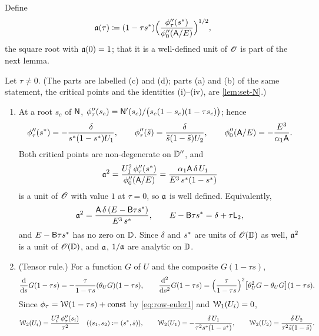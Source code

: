 Define
\begin{equation}
\label{eq:row-algdef}
\mathfrak{a}(\tau)\coloneqq(1-\tau s^{\ast})\Big(\frac{\phi_\tau''(s^{\ast})}{\phi_0''(\mathsf{A}/E)}\Big)^{1/2},
\end{equation}
the square root with $\mathfrak{a}(0)=1$; that it is a well-defined unit of $\mathscr{O}$ is part of the next lemma.

\begin{lem}
\label{lem:row-hess}
Let $\tau\neq0$. (The parts are labelled (c) and (d); parts (a) and (b) of the same statement, the critical points and the identities (i)--(iv), are \cref{lem:set-N}.)
\begin{enumerate}
\item[(c)] At a root $s_c$ of $\mathsf{N}$, $\phi_\tau''(s_c)=\mathsf{N}'(s_c)/\big(s_c(1-s_c)(1-\tau s_c)\big)$; hence
\begin{equation}
\label{eq:row-hess}
\phi_\tau''(s^{\ast})=-\frac{\delta}{s^{\ast}(1-s^{\ast})U_1},\qquad
\phi_\tau''(\tilde{s})=\frac{\delta}{\tilde{s}(1-\tilde{s})U_2},\qquad
\phi_0''(\mathsf{A}/E)=-\frac{E^3}{\alpha_1\mathsf{A}}.
\end{equation}
Both critical points are non-degenerate on $\mathbb{D}''$, and
\begin{equation}
\label{eq:row-alg}
\mathfrak{a}^2=\frac{U_1^2\,\phi_\tau''(s^{\ast})}{\phi_0''(\mathsf{A}/E)}=\frac{\alpha_1\mathsf{A}\,\delta\,U_1}{E^3\,s^{\ast}(1-s^{\ast})}
\end{equation}
is a unit of $\mathscr{O}$ with value $1$ at $\tau=0$, so $\mathfrak{a}$ is well defined. Equivalently,
\begin{equation}
\label{eq:row-algp}
\mathfrak{a}^2=\frac{\mathsf{A}\,\delta\,(E-\mathsf{B}\tau s^{\ast})}{E^3\,s^{\ast}},\qquad E-\mathsf{B}\tau s^{\ast}=\delta+\tau\mathsf{L}_2,
\end{equation}
and $E-\mathsf{B}\tau s^{\ast}$ has no zero on $\mathbb{D}$. Since $\delta$ and $s^{\ast}$ are units of $\mathscr{O}(\mathbb{D})$ as well, $\mathfrak{a}^2$ is a unit of $\mathscr{O}(\mathbb{D})$, and $\mathfrak{a}$, $1/\mathfrak{a}$ are analytic on $\mathbb{D}$.
\item[(d)] (Tensor rule.) For a function $G$ of $U$ and the composite $G(1-\tau s)$,
\[
\frac{\mathrm{d}}{\mathrm{d} s}G(1-\tau s)=-\frac{\tau}{1-\tau s}(\theta_{U} G)(1-\tau s),\qquad
\frac{\mathrm{d}^2}{\mathrm{d} s^2}G(1-\tau s)=\Big(\frac{\tau}{1-\tau s}\Big)^2\big[\theta_{U}^2G-\theta_{U} G\big](1-\tau s).
\]
Since $\phi_\tau=\mathcal{W}(1-\tau s)+\mathrm{const}$ by \eqref{eq:row-euler1} and $\mathcal{W}_1(U_i)=0$,
\begin{equation}
\label{eq:row-tensor}
\mathcal{W}_2(U_i)=\frac{U_i^2\,\phi_\tau''(s_i)}{\tau^2}\quad((s_1,s_2)\coloneqq(s^{\ast},\tilde{s})),\qquad
\mathcal{W}_2(U_1)=-\frac{\delta\,U_1}{\tau^2s^{\ast}(1-s^{\ast})},\qquad
\mathcal{W}_2(U_2)=\frac{\delta\,U_2}{\tau^2\tilde{s}(1-\tilde{s})}.
\end{equation}
\end{enumerate}
\end{lem}


